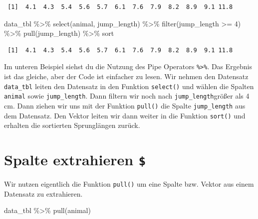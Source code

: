 \documentclass[
  letterpaper,
  DIV=11,
  oneside]{scrreport}
\newenvironment{Shaded}{\begin{snugshade}}{\end{snugshade}}
\newcommand{\DecValTok}[1]{\textcolor[rgb]{0.68,0.00,0.00}{#1}}
\newcommand{\FunctionTok}[1]{\textcolor[rgb]{0.28,0.35,0.67}{#1}}
\newcommand{\NormalTok}[1]{\textcolor[rgb]{0.00,0.23,0.31}{#1}}
\newcommand{\SpecialCharTok}[1]{\textcolor[rgb]{0.37,0.37,0.37}{#1}}
\begin{document}
\begin{verbatim}
 [1]  4.1  4.3  5.4  5.6  5.7  6.1  7.6  7.9  8.2  8.9  9.1 11.8
\end{verbatim}

\begin{Shaded}
\begin{Highlighting}[]
\NormalTok{data\_tbl }\SpecialCharTok{\%\textgreater{}\%} 
  \FunctionTok{select}\NormalTok{(animal, jump\_length) }\SpecialCharTok{\%\textgreater{}\%} 
  \FunctionTok{filter}\NormalTok{(jump\_length }\SpecialCharTok{\textgreater{}=} \DecValTok{4}\NormalTok{) }\SpecialCharTok{\%\textgreater{}\%} 
  \FunctionTok{pull}\NormalTok{(jump\_length) }\SpecialCharTok{\%\textgreater{}\%} 
\NormalTok{  sort}
\end{Highlighting}
\end{Shaded}

\begin{verbatim}
 [1]  4.1  4.3  5.4  5.6  5.7  6.1  7.6  7.9  8.2  8.9  9.1 11.8
\end{verbatim}

Im unteren Beispiel siehst du die Nutzung des Pipe Operators
\texttt{\%\textgreater{}\%}. Das Ergebnis ist das gleiche, aber der Code
ist einfacher zu lesen. Wir nehmen den Datensatz \texttt{data\_tbl}
leiten den Datensatz in den Funktion \texttt{select()} und wählen die
Spalten \texttt{animal} sowie \texttt{jump\_length}. Dann filtern wir
noch nach \texttt{jump\_length}größer als 4 cm. Dann ziehen wir uns mit
der Funktion \texttt{pull()} die Spalte \texttt{jump\_length} aus dem
Datensatz. Den Vektor leiten wir dann weiter in die Funktion
\texttt{sort()} und erhalten die sortierten Sprunglängen zurück.

\hypertarget{sec-dollar}{%
\section{\texorpdfstring{Spalte extrahieren
\texttt{\$}}{Spalte extrahieren \$}}\label{sec-dollar}}

Wir nutzen eigentlich die Funktion \texttt{pull()} um eine Spalte bzw.
Vektor aus einem Datensatz zu extrahieren.

\begin{Shaded}
\begin{Highlighting}[]
\NormalTok{data\_tbl }\SpecialCharTok{\%\textgreater{}\%} 
  \FunctionTok{pull}\NormalTok{(animal)}
\end{Highlighting}
\end{Shaded}
\end{document}
